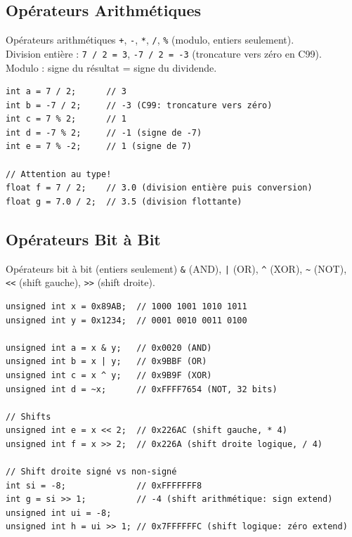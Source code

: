 \documentclass[10pt,a4paper]{article}
\begin{document}
\subsection{Opérateurs Arithmétiques}

\begin{techbox}{Opérateurs arithmétiques}
\texttt{+}, \texttt{-}, \texttt{*}, \texttt{/}, \texttt{\%} (modulo, entiers seulement).\\
Division entière : \texttt{7 / 2 = 3}, \texttt{-7 / 2 = -3} (troncature vers zéro en C99).\\
Modulo : signe du résultat = signe du dividende.
\end{techbox}

\begin{lstlisting}[caption={Division et modulo}]
int a = 7 / 2;      // 3
int b = -7 / 2;     // -3 (C99: troncature vers zéro)
int c = 7 % 2;      // 1
int d = -7 % 2;     // -1 (signe de -7)
int e = 7 % -2;     // 1 (signe de 7)

// Attention au type!
float f = 7 / 2;    // 3.0 (division entière puis conversion)
float g = 7.0 / 2;  // 3.5 (division flottante)
\end{lstlisting}

\subsection{Opérateurs Bit à Bit}

\begin{techbox}{Opérateurs bit à bit (entiers seulement)}
\texttt{\&} (AND), \texttt{|} (OR), \texttt{\^{}} (XOR), \texttt{\~{}} (NOT), \texttt{<<} (shift gauche), \texttt{>>} (shift droite).
\end{techbox}

\begin{lstlisting}[caption={Opérations bit à bit}]
unsigned int x = 0x89AB;  // 1000 1001 1010 1011
unsigned int y = 0x1234;  // 0001 0010 0011 0100

unsigned int a = x & y;   // 0x0020 (AND)
unsigned int b = x | y;   // 0x9BBF (OR)
unsigned int c = x ^ y;   // 0x9B9F (XOR)
unsigned int d = ~x;      // 0xFFFF7654 (NOT, 32 bits)

// Shifts
unsigned int e = x << 2;  // 0x226AC (shift gauche, * 4)
unsigned int f = x >> 2;  // 0x226A (shift droite logique, / 4)

// Shift droite signé vs non-signé
int si = -8;              // 0xFFFFFFF8
int g = si >> 1;          // -4 (shift arithmétique: sign extend)
unsigned int ui = -8;
unsigned int h = ui >> 1; // 0x7FFFFFFC (shift logique: zéro extend)
\end{lstlisting}
\end{document}
